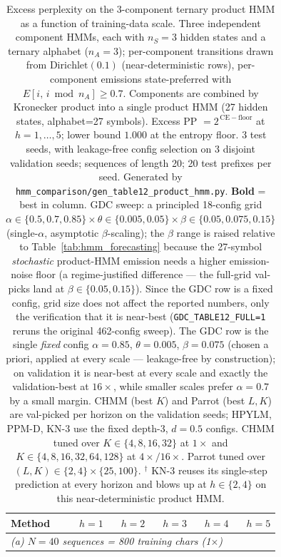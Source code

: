 \begin{table}[t]
\centering
\caption{Excess perplexity on the 3-component ternary product HMM as a function of training-data scale. Three independent component HMMs, each with $n_S{=}3$ hidden states and a ternary alphabet ($n_A{=}3$); per-component transitions drawn from $\mathrm{Dirichlet}(0.1)$ (near-deterministic rows), per-component emissions state-preferred with $E[i,\,i\bmod n_A]\ge 0.7$. Components are combined by Kronecker product into a single product HMM (27 hidden states, alphabet=27 symbols). Excess PP $= 2^{\,\mathrm{CE}-\mathrm{floor}}$ at $h{=}1{,}\ldots{,}5$; lower bound $1.000$ at the entropy floor. 3 test seeds, with leakage-free config selection on 3 disjoint validation seeds; sequences of length 20; 20 test prefixes per seed. Generated by \texttt{hmm\_comparison/gen\_table12\_product\_hmm.py}. \textbf{Bold} = best in column. GDC sweep: a principled 18-config grid $\alpha\in\{0.5{,}0.7{,}0.85\}\times\theta\in\{0.005{,}0.05\}\times\beta\in\{0.05{,}0.075{,}0.15\}$ (single-$\alpha$, asymptotic $\beta$-scaling); the $\beta$ range is raised relative to Table~\ref{tab:hmm_forecasting} because the 27-symbol \emph{stochastic} product-HMM emission needs a higher emission-noise floor (a regime-justified difference --- the full-grid val-picks land at $\beta\in\{0.05{,}0.15\}$). Since the GDC row is a fixed config, grid size does not affect the reported numbers, only the verification that it is near-best (\texttt{GDC\_TABLE12\_FULL=1} reruns the original 462-config sweep). The GDC row is the single \emph{fixed} config $\alpha{=}0.85$, $\theta{=}0.005$, $\beta{=}0.075$ (chosen a priori, applied at every scale --- leakage-free by construction); on validation it is near-best at every scale and exactly the validation-best at $16\times$, while smaller scales prefer $\alpha{=}0.7$ by a small margin. CHMM (best $K$) and Parrot (best $L,K$) are val-picked per horizon on the validation seeds; HPYLM, PPM-D, KN-3 use the fixed depth-3, $d{=}0.5$ configs. CHMM tuned over $K\in\{4{,}8{,}16{,}32\}$ at $1\times$ and $K\in\{4{,}8{,}16{,}32{,}64{,}128\}$ at $4\times{/}16\times$. Parrot tuned over $(L,K)\in\{2{,}4\}\times\{25{,}100\}$. $^\dagger$ KN-3 reuses its single-step prediction at every horizon and blows up at $h \in \{2,4\}$ on this near-deterministic product HMM.}
\label{tab:product_hmm_scaling}
\small
\begin{tabular}{l r r r r r}
\toprule
Method & $h{=}1$ & $h{=}2$ & $h{=}3$ & $h{=}4$ & $h{=}5$ \\
\midrule
\multicolumn{6}{l}{\emph{(a) $N{=}40$ sequences = 800 training chars (1$\times$)}} \\

\end{tabular}
\end{table}
